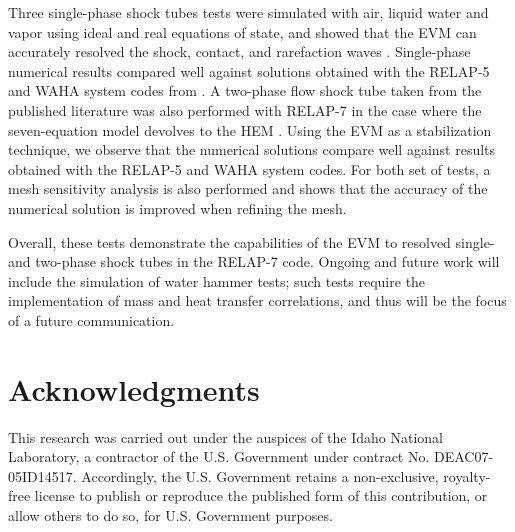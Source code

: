 \documentclass{inputs/mc2015}
\begin{document}
Three single-phase shock tubes tests were simulated with air, liquid water and vapor using ideal and real equations of state, and showed that the EVM can accurately resolved the shock, contact, and rarefaction waves  . Single-phase numerical results compared well against solutions obtained with the RELAP-5 and WAHA system codes from \cite{Sokolowski-Koszela}. A two-phase flow shock tube taken from the published literature was also performed with RELAP-7 in the case where the seven-equation model devolves to the HEM  . Using the EVM as a stabilization technique, we observe that the numerical solutions compare well against results obtained with the RELAP-5 and WAHA system codes. For both set of tests, a mesh sensitivity analysis is also performed and shows that the accuracy of the numerical solution is improved when refining the mesh. 

Overall, these tests demonstrate the capabilities of the EVM to resolved single- and two-phase shock tubes in the RELAP-7 code. Ongoing and future work will include the simulation of water hammer tests; such tests require the implementation of mass and heat transfer correlations, and thus will be the focus of a future communication.

\section{Acknowledgments}

This research was carried out under the auspices of the Idaho National Laboratory, a contractor of the U.S. Government under contract No. DEAC07-05ID14517.  Accordingly, the U.S. Government retains a non-exclusive, royalty-free license to publish or reproduce the published form of this contribution, or allow others to do so, for U.S. Government purposes.
 

\setlength{\baselineskip}{12pt}



\end{document}
